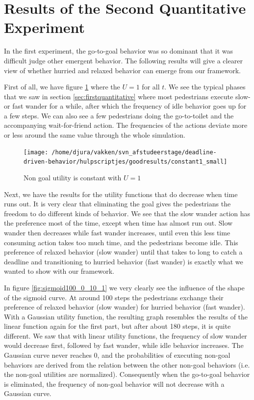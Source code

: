 \documentclass[11pt, a4paper]{book}
\begin{document}
\section{Results of the Second Quantitative Experiment}
\label{sec:secondquantitativeexperimentresults}
In the first experiment, the go-to-goal behavior was so dominant that it was difficult judge other emergent behavior. The following results will give a clearer view of whether hurried and relaxed behavior can emerge from our framework.

First of all, we have figure \ref{fig:constant1} where the $U=1$ for all $t$. We see the typical phases that we saw in section \ref{sec:firstquantitative} where most pedestrians execute slow- or fast wander for a while, after which the frequency of idle behavior goes up for a few steps. We can also see a few pedestrians doing the go-to-toilet and the accompanying wait-for-friend action. The frequencies of the actions deviate more or less around the same value through the whole simulation.

\begin{figure}
\centering
\texttt{[image: /home/djura/vakken/svn\_afstudeerstage/deadline-driven-behavior/hulpscriptjes/goodresults/constant1\_small]}
\caption{Non goal utility is constant with $U=1$}
\label{fig:constant1}
\end{figure}

Next, we have the results for the utility functions that do decrease when time runs out. It is very clear that eliminating the goal gives the pedestrians the freedom to do different kinds of behavior. We see that the slow wander action has the preference most of the time, except when time has almost run out. Slow wander then decreases while fast wander increases, until even this less time consuming action takes too much time, and the pedestrians become idle. This preference of relaxed behavior (slow wander) until that takes to long to catch a deadline and transitioning to hurried behavior (fast wander) is exactly what we wanted to show with our framework.


In figure \ref{fig:sigmoid100_0_10_1} we very clearly see the influence of the shape of the sigmoid curve. At around 100 steps the pedestrians exchange their preference of relaxed behavior (slow wander) for hurried behavior (fast wander). With a Gaussian utility function, the resulting graph resembles the results of the linear function again for the first part, but after about 180 steps, it is quite different. We saw that with linear utility functions, the frequency of slow wander would decrease first, followed by fast wander, while idle behavior increases. The Gaussian curve never reaches 0, and the probabilities of executing non-goal behaviors are derived from the relation between the other non-goal behaviors (i.e. the non-goal utilities are normalized). Consequently when the go-to-goal behavior is eliminated, the frequency of non-goal behavior will not decrease with a Gaussian curve.
\end{document}
